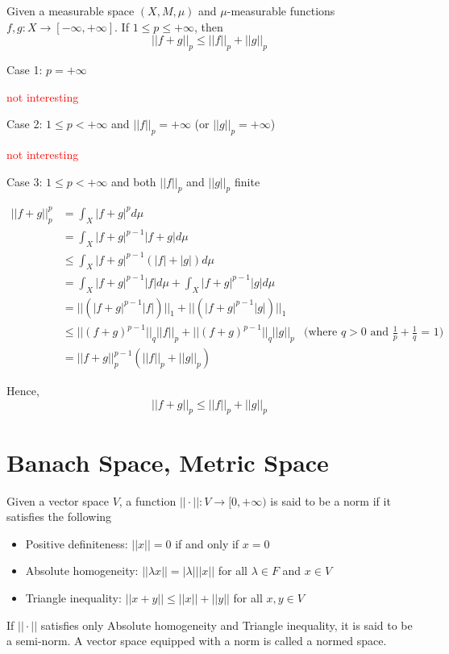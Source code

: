 \documentclass{report}
\begin{document}
\begin{theorem}
    Given a measurable space $(X, M, \mu)$ and $\mu$-measurable functions $f, g: X \to [-\infty, +\infty]$. If $1 \leq p \leq +\infty$, then
    \[
        ||f + g||_p \leq ||f||_p + ||g||_p
    \]
\end{theorem}

Case 1: $p = +\infty$

\textcolor{red}{not interesting}

Case 2: $1 \leq p < +\infty$ and $||f||_p = +\infty$ (or $||g||_p = +\infty$)

\textcolor{red}{not interesting}

Case 3: $1 \leq p < +\infty$ and both $||f||_p$ and $||g||_p$ finite

\begin{align*}
    ||f + g||_p^p
    &= \int_X |f+g|^p d\mu \\
    &= \int_X |f+g|^{p-1} |f+g| d\mu \\
    &\leq \int_X |f+g|^{p-1} (|f| + |g|) d\mu \\
    &= \int_X |f+g|^{p-1} |f| d\mu + \int_X |f+g|^{p-1} |g| d\mu \\
    &= || (|f+g|^{p-1} |f|) ||_1 + || (|f+g|^{p-1} |g|) ||_1 \\
    &\leq ||(f+g)^{p-1}||_q ||f||_p + ||(f+g)^{p-1}||_q ||g||_p &\text{(where $q > 0$ and $\frac{1}{p} + \frac{1}{q}$ = 1)}\\
    &= ||f+g||_p^{p-1} (||f||_p + ||g||_p)
\end{align*}

Hence,
\[
    ||f + g||_p \leq ||f||_p + ||g||_p
\]


\section{Banach Space, Metric Space}

\begin{definition}
    Given a vector space $V$, a function $||\cdot||: V \to [0, +\infty)$ is said to be a norm if it satisfies the following
    \begin{itemize}
        \item Positive definiteness: $||x|| = 0$ if and only if $x = 0$
        \item Absolute homogeneity: $||\lambda x|| = |\lambda| ||x||$ for all $\lambda \in F$ and $x \in V$
        \item Triangle inequality: $||x + y|| \leq ||x|| + ||y||$ for all $x, y \in V$
    \end{itemize}
    If $||\cdot||$ satisfies only Absolute homogeneity and Triangle inequality, it is said to be a semi-norm. A vector space equipped with a norm is called a normed space.
\end{definition}
\end{document}
